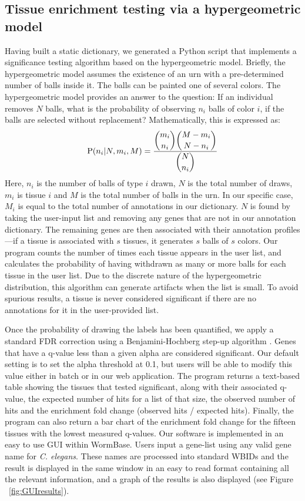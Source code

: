 \documentclass[linenumbers, doublespacing]{bmcart}
\begin{document}
\subsection*{Tissue enrichment testing via a hypergeometric model}
	Having built a static dictionary, we generated a Python script that implements a significance testing algorithm based on the hypergeometric model. Briefly, the hypergeometric model assumes the existence of an urn with a pre-determined number of balls inside it. The balls can be painted one of several colors. The hypergeometric model provides an answer to the question: If an individual removes $N$ balls, what is the probability of observing $n_i$ balls of color $i$, if the balls are selected without replacement? Mathematically, this is expressed as:
\begin{eqnarray}\label{hypergeometric}
	\mathrm{P}(n_i | N, m_i, M) = \frac{\dbinom{m_i}{n_i} \dbinom{M-m_i}{N - n_i}}{\dbinom{N}{n_i}}
\end{eqnarray}
	Here, $n_i$ is the number of balls of type $i$ drawn, $N$ is the total number of draws, $m_i$ is tissue $i$ and $M$ is the total number of balls in the urn. In our specific case, $M_i$ is equal to the total number of annotations in our dictionary. $N$ is found by taking the user-input list and removing any genes that are not in our annotation dictionary. The remaining genes are then associated with their annotation profiles---if a tissue is associated with $s$ tissues, it generates $s$ balls of $s$ colors. Our program counts the number of times each tissue appears in the user list, and calculates the probability of having withdrawn as many or more balls for each tissue in the user list. Due to the discrete nature of the hypergeometric distribution, this algorithm can generate artifacts when the list is small. To avoid spurious results, a tissue is never considered significant if there are no annotations for it in the user-provided list.

	Once the probability of drawing the labels has been quantified, we apply a standard FDR correction using a Benjamini-Hochberg step-up algorithm \cite{Benjamini1995}. Genes that have a q-value less than a given alpha are considered significant. Our default setting is to set the alpha threshold at 0.1, but users will be able to modify this value either in batch or in our web application. The program returns a text-based table showing the tissues that tested significant, along with their associated q-value, the expected number of hits for a list of that size, the observed number of hits and the enrichment fold change (observed hits / expected hits). Finally, the program can also return a bar chart of the enrichment fold change for the fifteen tissues with the lowest measured q-values.
	Our software is implemented in an easy to use GUI within WormBase. Users input a gene-list using any valid gene name for   \emph{C. elegans}. These names are processed into standard WBIDs and the result is displayed in the same window in an easy to read format containing all the relevant information, and a graph of the results is also displayed (see Figure ~\ref{fig:GUIresults}).
\end{document}
